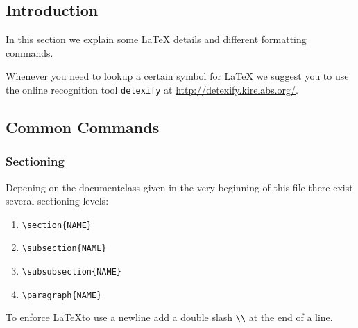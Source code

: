 \documentclass[10pt,a4paper]{scrartcl}
\begin{document}
\subsection{Introduction} 

In this section we explain some \LaTeX\xspace details and different formatting
commands.

Whenever you need to lookup a certain symbol for \LaTeX\xspace we suggest you
to use the online recognition tool \texttt{detexify} at
\url{http://detexify.kirelabs.org/}.


\subsection{Common Commands}
\subsubsection{Sectioning}
Depening on the documentclass given in the very beginning of this file there
exist several sectioning levels:
\begin{enumerate}
\item{} \verb$\section{NAME}$
\item{} \verb$\subsection{NAME}$
\item{} \verb$\subsubsection{NAME}$
\item{} \verb$\paragraph{NAME}$
\end{enumerate}

\noindent To enforce \LaTeX to use a newline add a double slash \verb$\\$ at 
the end of a line.
\end{document}
